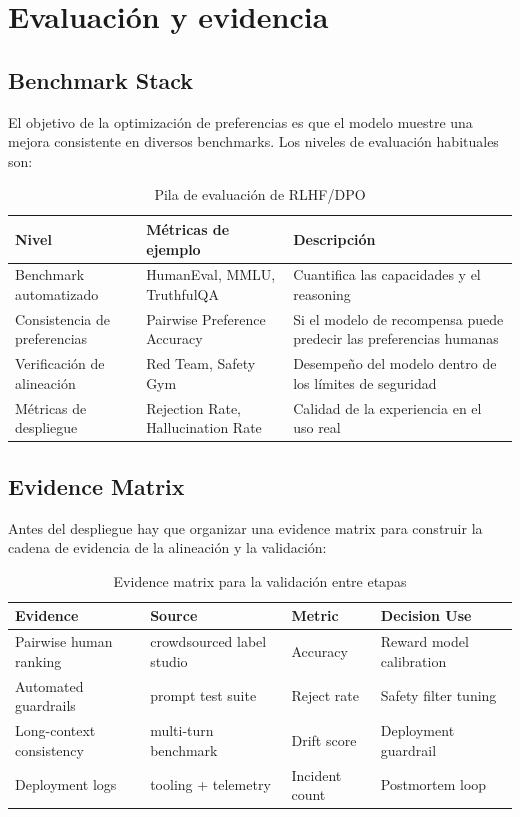 \section{Evaluación y evidencia}

\subsection{Benchmark Stack}

El objetivo de la optimización de preferencias es que el modelo muestre una mejora consistente en diversos benchmarks. Los niveles de evaluación habituales son:

\begin{table}[H]
\centering
\begin{tabular}{p{} p{} p{}}
\toprule
Nivel & Métricas de ejemplo & Descripción \\
\midrule
Benchmark automatizado & HumanEval, MMLU, TruthfulQA & Cuantifica las capacidades y el reasoning \\
Consistencia de preferencias & Pairwise Preference Accuracy & Si el modelo de recompensa puede predecir las preferencias humanas \\
Verificación de alineación & Red Team, Safety Gym & Desempeño del modelo dentro de los límites de seguridad \\
Métricas de despliegue & Rejection Rate, Hallucination Rate & Calidad de la experiencia en el uso real \\
\bottomrule
\end{tabular}
\caption{Pila de evaluación de RLHF/DPO}
\end{table}

\subsection{Evidence Matrix}

Antes del despliegue hay que organizar una evidence matrix para construir la cadena de evidencia de la alineación y la validación:

\begin{table}[H]
\centering
\begin{tabular}{p{} p{} p{} p{}}
\toprule
Evidence & Source & Metric & Decision Use \\
\midrule
Pairwise human ranking & crowdsourced label studio & Accuracy & Reward model calibration \\
Automated guardrails & prompt test suite & Reject rate & Safety filter tuning \\
Long-context consistency & multi-turn benchmark & Drift score & Deployment guardrail \\
Deployment logs & tooling + telemetry & Incident count & Postmortem loop \\
\bottomrule
\end{tabular}
\caption{Evidence matrix para la validación entre etapas}
\end{table}

